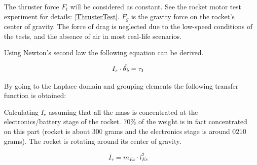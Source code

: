 		The thruster force $F_t$ will be considered as constant. See the rocket motor test experiment for details: \autoref{ThrusterTest}. $F_g$ is the gravity force on the rocket's center of gravity. The force of drag is neglected due to the low-speed conditions of the tests, and the absence of air in most real-life scenarios.
		
		Using Newton's second law the following equation can be derived.

		\begin{equation}
			I_r \cdot \ddot{\theta_b}=\tau_t \addunit{\newton$\cdot$\meter} \label{eq:rocket_angle_1}
		\end{equation}
		\startexplain
		\stopexplain
		
%		
		
		By going to the Laplace domain and grouping elements the following transfer function is obtained:
%		
		
		Calculating $I_r$ assuming that all the mass is concentrated at the electronics/battery stage of the rocket. $70\%$ of the weight is in fact concentrated on this part (rocket is about $300$ grams and the electronics stage is around $0210$ grams). The rocket is rotating around its center of gravity.
		
		\begin{equation}
		I_r=m_{Es} \cdot l_{Es}^2 \label{eq:rocket_angle_3}
		\end{equation}
		\startexplain
		\stopexplain
		
